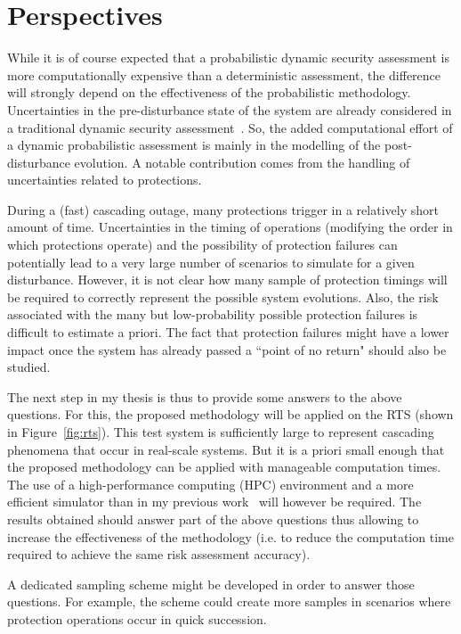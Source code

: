 \chapter{Perspectives}
\label{ch:perspectives}

While it is of course expected that a probabilistic dynamic security assessment is more computationally expensive than a deterministic assessment, the difference will strongly depend on the effectiveness of the probabilistic methodology. Uncertainties in the pre-disturbance state of the system are already considered in a traditional dynamic security assessment~\cite{EurostagHPC}. So, the added computational effort of a dynamic probabilistic assessment is mainly in the modelling of the post-disturbance evolution. A notable contribution comes from the handling of uncertainties related to protections.

During a (fast) cascading outage, many protections trigger in a relatively short amount of time. Uncertainties in the timing of operations (modifying the order in which protections operate) and the possibility of protection failures can potentially lead to a very large number of scenarios to simulate for a given disturbance. However, it is not clear how many sample of protection timings will be required to correctly represent the possible system evolutions. Also, the risk associated with the many but low-probability possible protection failures is difficult to estimate a priori. The fact that protection failures might have a lower impact once the system has already passed a ``point of no return" should also be studied.

The next step in my thesis is thus to provide some answers to the above questions. For this, the proposed methodology will be applied on the RTS (shown in Figure~\ref{fig:rts}). This test system is sufficiently large to represent cascading phenomena that occur in real-scale systems. But it is a priori small enough that the proposed methodology can be applied with manageable computation times. The use of a high-performance computing (HPC) environment and a more efficient simulator than in my previous work~\cite{MCDETasTool} will however be required. The results obtained should answer part of the above questions thus allowing to increase the effectiveness of the methodology (i.e. to reduce the computation time required to achieve the same risk assessment accuracy).

A dedicated sampling scheme might be developed in order to answer those questions. For example, the scheme could create more samples in scenarios where protection operations occur in quick succession.

